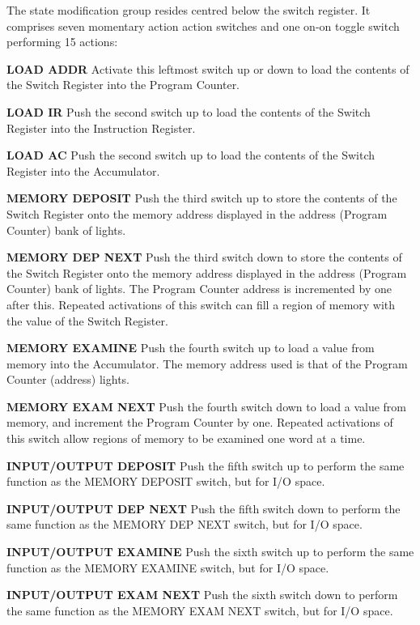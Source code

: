 \documentclass[11pt,a4paper,twocolumns]{article}
\newcommand{\sw}[1]{\textsf{#1}}
\begin{document}
The state modification group resides centred below the switch
register. It comprises seven momentary action action switches and one
on-on toggle switch performing 15 actions:

\begin{description}
\item{\bf\sw{LOAD ADDR}} Activate this leftmost switch up or down to load the
  contents of the Switch Register into the Program Counter.
\item{\bf\sw{LOAD IR}} Push the second switch up to load the contents
  of the Switch Register into the Instruction Register.
\item{\bf\sw{LOAD AC}} Push the second switch up to load the contents
  of the Switch Register into the Accumulator.
\item{\bf\sw{MEMORY DEPOSIT}} Push the third switch up to store the
  contents of the Switch Register onto the memory address displayed in
  the address (Program Counter) bank of lights.
\item{\bf\sw{MEMORY DEP NEXT}} Push the third switch down to store the
  contents of the Switch Register onto the memory address displayed in
  the address (Program Counter) bank of lights. The Program Counter
  address is incremented by one after this. Repeated activations of
  this switch can fill a region of memory with the value of the Switch
  Register.
\item{\bf\sw{MEMORY EXAMINE}} Push the fourth switch up to load a
  value from memory into the Accumulator. The memory address used is
  that of the Program Counter (address) lights.
\item{\bf\sw{MEMORY EXAM NEXT}} Push the fourth switch down to load a
  value from memory, and increment the Program Counter by
  one. Repeated activations of this switch allow regions of memory to
  be examined one word at a time.
\item{\bf\sw{INPUT/OUTPUT DEPOSIT}} Push the fifth switch up to
  perform the same function as the \sw{MEMORY DEPOSIT} switch, but for
  I/O space.
\item{\bf\sw{INPUT/OUTPUT DEP NEXT}} Push the fifth switch down to
  perform the same function as the \sw{MEMORY DEP NEXT} switch, but
  for I/O space.
\item{\bf\sw{INPUT/OUTPUT EXAMINE}} Push the sixth switch up to
  perform the same function as the \sw{MEMORY EXAMINE} switch, but for
  I/O space.
\item{\bf\sw{INPUT/OUTPUT EXAM NEXT}} Push the sixth switch down to
  perform the same function as the \sw{MEMORY EXAM NEXT} switch, but
  for I/O space.


\end{description}
\end{document}
